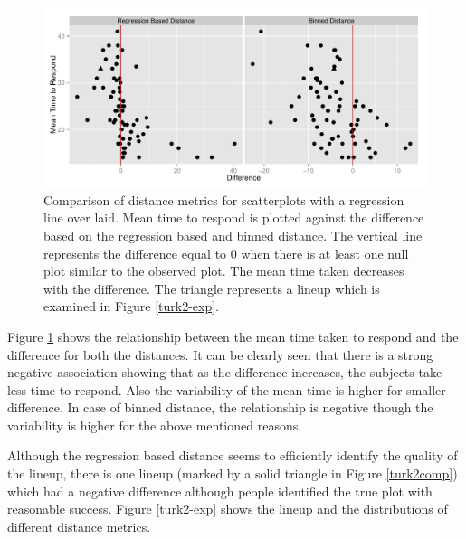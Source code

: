 \documentclass[12]{article}
\begin{document}
\begin{figure}[hbtp]
\centering
\includegraphics[scale=0.75]{turk2-mtime-reg-bin.pdf}
	\vspace{-.1in}
\caption[Optional caption for list of figures]{Comparison of distance metrics for scatterplots with a regression line over laid. Mean time to respond is plotted against the difference based on the regression based and binned distance. The vertical line represents the difference equal to 0 when there is at least one null plot similar to the observed plot. The mean time taken decreases with the difference. The triangle represents a lineup which is examined in Figure \ref{turk2-exp}.   }
\label{turk2-mtime}
\end{figure}

Figure \ref{turk2-mtime} shows the relationship between the mean time taken to respond and the difference for both the distances. It can be clearly seen that there is a strong negative association showing that as the difference increases, the subjects take less time to respond. Also the variability of the mean time is higher for smaller difference. In case of binned distance, the relationship is negative though the variability is higher for the above mentioned reasons.

Although the regression based distance seems to efficiently identify the quality of the lineup, there is one lineup (marked by a solid triangle in Figure \ref{turk2comp}) which had a negative difference although people identified the true plot with reasonable success.  Figure \ref{turk2-exp} shows the lineup and the distributions of different distance metrics. 
\end{document}

